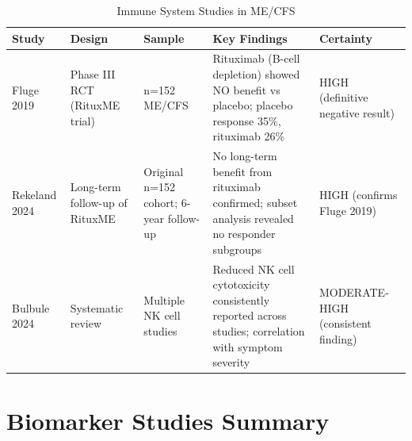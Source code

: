 \begin{table}[htbp]
\centering
\caption{Immune System Studies in ME/CFS}
\label{tab:immune-studies}
\scriptsize
\begin{tabular}{p{2cm}p{2cm}p{2.2cm}p{4.2cm}p{2cm}}
\toprule
\textbf{Study} & \textbf{Design} & \textbf{Sample} & \textbf{Key Findings} & \textbf{Certainty} \\
\midrule
Fluge 2019~\cite{Fluge2019} & Phase III RCT (RituxME trial) & n=152 ME/CFS & Rituximab (B-cell depletion) showed NO benefit vs placebo; placebo response 35\%, rituximab 26\% & HIGH (definitive negative result) \\
\midrule
Rekeland 2024~\cite{Rekeland2024} & Long-term follow-up of RituxME & Original n=152 cohort; 6-year follow-up & No long-term benefit from rituximab confirmed; subset analysis revealed no responder subgroups & HIGH (confirms Fluge 2019) \\
\midrule
Bulbule 2024~\cite{Bulbule2024} & Systematic review & Multiple NK cell studies & Reduced NK cell cytotoxicity consistently reported across studies; correlation with symptom severity & MODERATE-HIGH (consistent finding) \\
\bottomrule
\end{tabular}
\end{table}

\section{Biomarker Studies Summary}
\label{sec:biomarker-studies-summary}


